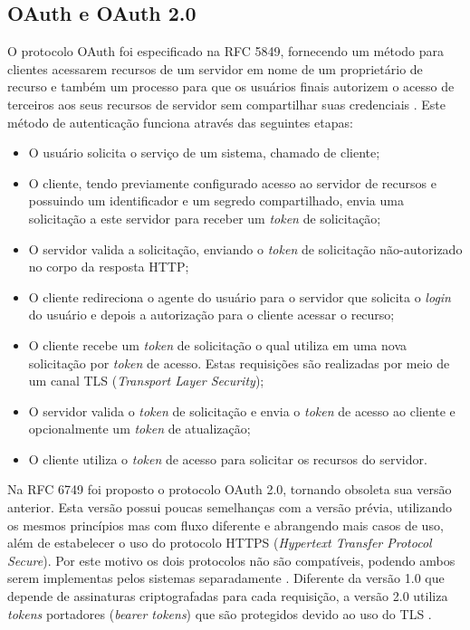 \subsection{OAuth e OAuth 2.0}

O protocolo OAuth foi especificado na RFC 5849, fornecendo um método para clientes acessarem 
recursos de um servidor em nome de um proprietário de recurso e também um processo para que os 
usuários finais autorizem o acesso de terceiros aos seus recursos de servidor sem compartilhar suas
credenciais \cite{RFC5849}. Este método de autenticação funciona através das seguintes etapas:

\begin{itemize}
\item O usuário solicita o serviço de um sistema, chamado de cliente;
\item O cliente, tendo previamente configurado acesso ao servidor de recursos e possuindo um 
identificador e um segredo compartilhado, envia uma solicitação a este servidor para receber um 
\emph{token} de solicitação;
\item O servidor valida a solicitação, enviando o \emph{token} de solicitação não-autorizado no 
corpo da resposta HTTP;
\item O cliente redireciona o agente do usuário para o servidor que solicita o \emph{login} do 
usuário e depois a autorização para o cliente acessar o recurso;
\item O cliente recebe um \emph{token} de solicitação o qual utiliza em uma nova solicitação por 
\emph{token} de acesso. Estas requisições são realizadas por meio de um canal TLS (\emph{Transport Layer Security});
\item O servidor valida o \emph{token} de solicitação e envia o \emph{token} de acesso ao cliente e 
opcionalmente um \emph{token} de atualização;
\item O cliente utiliza o \emph{token} de acesso para solicitar os recursos do servidor.
\end{itemize}

Na RFC 6749 foi proposto o protocolo OAuth 2.0, tornando obsoleta sua versão anterior. Esta versão possui 
poucas semelhanças com a versão prévia, utilizando os mesmos princípios mas com fluxo diferente e 
abrangendo mais casos de uso, além de estabelecer o uso do protocolo HTTPS (\emph{Hypertext Transfer 
Protocol Secure}). Por este motivo os dois protocolos não são compatíveis, podendo ambos serem 
implementas pelos sistemas separadamente \cite{RFC6749}. Diferente da versão 1.0 que depende de assinaturas 
criptografadas para cada requisição, a versão 2.0 utiliza \emph{tokens} portadores (\emph{bearer tokens}) 
que são protegidos devido ao uso do TLS \cite{SIRIWARDENA2014}. 

